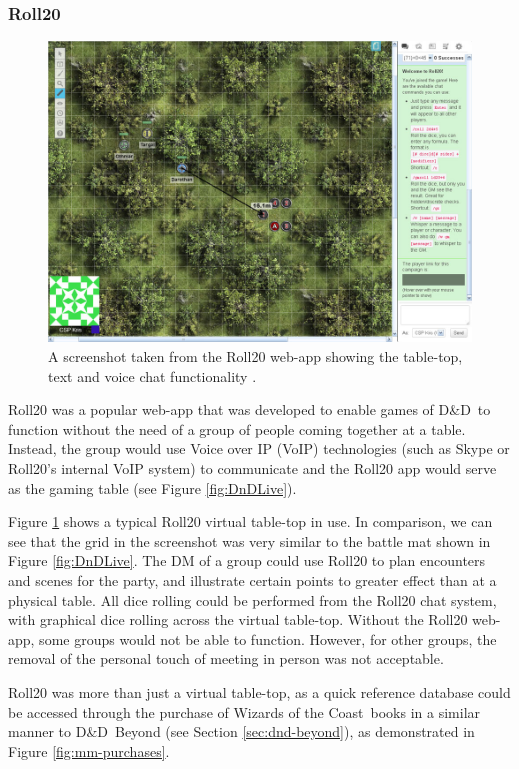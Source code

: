 \documentclass[final]{cmpreport}
\newcommand{\WotC}{Wizards of the Coast}
\newcommand{\dnd}{D\&D}
\begin{document}
			\subsubsection{Roll20} \label{sec:roll20}
			\begin{figure}[h]
				\centering
				\includegraphics[width=0.75\linewidth]{roll20-example.jpg}
				\caption[Roll20 Screenshot]{A screenshot taken from the Roll20 web-app showing the table-top, text and voice chat functionality \citep{roll20-example}.} \label{fig:roll20}
			\end{figure}
		
			Roll20 \citep{roll20} was a popular web-app that was developed to enable games of \dnd \ to function without the need of a group of people coming together at a table. Instead, the group would use Voice over IP (VoIP) technologies (such as Skype or Roll20's internal VoIP system) to communicate and the Roll20 app would serve as the gaming table (see Figure \ref{fig:DnDLive}). 			
			
			Figure \ref{fig:roll20} shows a typical Roll20 virtual table-top in use. In comparison, we can see that the grid in the screenshot was very similar to the battle mat shown in Figure \ref{fig:DnDLive}. The DM of a group could use Roll20 to plan encounters and scenes for the party, and illustrate certain points to greater effect than at a physical table. All dice rolling could be performed from the Roll20 chat system, with graphical dice rolling across the virtual table-top. Without the Roll20 web-app, some groups would not be able to function. However, for other groups, the removal of the personal touch of meeting in person was not acceptable. 
					
			Roll20 was more than just a virtual table-top, as a quick reference database could be accessed through the purchase of \WotC \ books in a similar manner to \dnd \ Beyond (see Section \ref{sec:dnd-beyond}), as demonstrated in Figure \ref{fig:mm-purchases}. 
			
\end{document}
